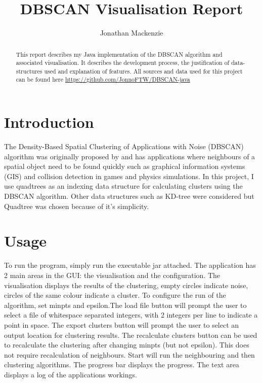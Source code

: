 \documentclass{CRPITStyle}
\renewcommand{\cite}{\citep}
\begin{document}
\title{DBSCAN Visualisation Report}
\author{Jonathan Mackenzie}

\maketitle

\begin{abstract}
This report describes my Java implementation of the DBSCAN algorithm and associated visualisation. It describes the development process, the justification of data-structures used and explanation of features. All sources and data used for this project can be found here \url{https://github.com/JonnoFTW/DBSCAN-java}
\end{abstract}
\vspace{.1in}

\section{Introduction}
The Density-Based Spatial Clustering of Applications with Noise (DBSCAN) algorithm was originally proposed by \cite{Ester96adensity-based} and has applications where neighbours of a spatial object need to be found quickly such as graphical information systems (GIS) and collision detection in games and physics simulations. In this project, I use quadtrees as an indexing data structure for calculating clusters using the DBSCAN algorithm. Other data structures such as KD-tree were considered but Quadtree was chosen because of it's simplicity.

\section{Usage}
To run the program, simply run the executable jar attached. The application has 2 main areas in the GUI: the visualisation and the configuration. The visualisation displays the results of the clustering, empty circles indicate noise, circles of the same colour indicate a cluster. To configure the run of the algorithm, set minpts and epsilon.The load file button will prompt the user to select a file of whitespace separated integers, with 2 integers per line to indicate a point in space. The export clusters button will prompt the user to select an output location for clustering results. The recalculate clusters button can be used to recalculate the clustering after changing minpts (but not epsilon). This does not require recalculation of neighbours. Start will run the neighbouring and then clustering algorithms. The progress bar displays the progress. The text area displays a log of the applications workings. 
\end{document}

